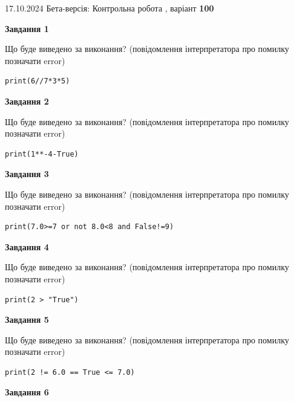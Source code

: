 \documentclass[12pt, ukrainian]{article}
\begin{document}
{\Large{17.10.2024 Бета-версія: Контрольна робота , варіант  \No \textbf { 100 }\par}}
{
\begin {large}
{\begin {center}\textbf{Завдання 1}\end {center}}

Що буде виведено за виконання? (повідомлення інтерпретатора про помилку позначати error)\par
\begin{verbatim}
print(6//7*3*5)
\end{verbatim}

{\begin {center}\textbf{Завдання 2}\end {center}}

Що буде виведено за виконання? (повідомлення інтерпретатора про помилку позначати error)\par
\begin{verbatim}
print(1**-4-True)
\end{verbatim}

{\begin {center}\textbf{Завдання 3}\end {center}}

Що буде виведено за виконання? (повідомлення інтерпретатора про помилку позначати error)\par
\begin{verbatim}
print(7.0>=7 or not 8.0<8 and False!=9)
\end{verbatim}

{\begin {center}\textbf{Завдання 4}\end {center}}

Що буде виведено за виконання? (повідомлення інтерпретатора про помилку позначати error)\par
\begin{verbatim}
print(2 > "True")
\end{verbatim}

{\begin {center}\textbf{Завдання 5}\end {center}}

Що буде виведено за виконання? (повідомлення інтерпретатора про помилку позначати error)\par
\begin{verbatim}
print(2 != 6.0 == True <= 7.0)
\end{verbatim}

{\begin {center}\textbf{Завдання 6}\end {center}}


\end{large}}
\end{document}
